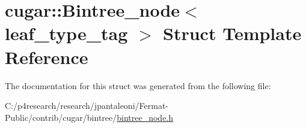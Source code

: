 \hypertarget{structcugar_1_1_bintree__node}{}\section{cugar\+:\+:Bintree\+\_\+node$<$ leaf\+\_\+type\+\_\+tag $>$ Struct Template Reference}
\label{structcugar_1_1_bintree__node}


The documentation for this struct was generated from the following file\+:\begin{DoxyCompactItemize}
\item 
C\+:/p4research/research/jpantaleoni/\+Fermat-\/\+Public/contrib/cugar/bintree/\hyperlink{bintree__node_8h}{bintree\+\_\+node.\+h}\end{DoxyCompactItemize}
